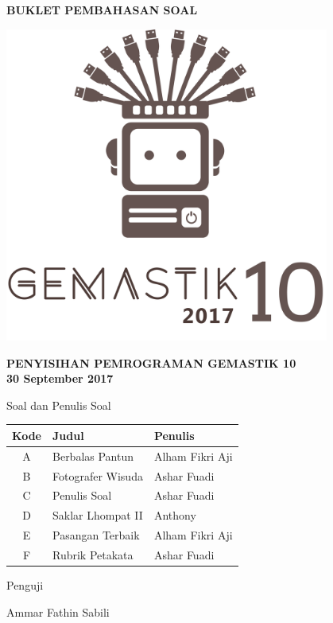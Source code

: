 \documentclass[a4paper]{article}
\begin{document}
\begin{titlepage}
\begin{center}

    \textbf{\huge BUKLET PEMBAHASAN SOAL}
    
    \vspace{1cm} %
    
    \includegraphics[width=0.8\textwidth]{../gemastiklogo}
    
	\vspace{1cm} %
    
    \textbf{\LARGE PENYISIHAN PEMROGRAMAN GEMASTIK 10}\\[0.5cm]
    \textbf{\LARGE 30 September 2017}

	\vfill
	
	{\Large Soal dan Penulis Soal}
	
	\vspace{.1cm}
	
	\def\arraystretch{1.5} %
	\begin{tabular}{|c|l|l|}
		\hline
		\textbf{Kode} & \textbf{Judul} & \textbf{Penulis} \\
		\hline
		A & Berbalas Pantun & Alham Fikri Aji \\
		B & Fotografer Wisuda & Ashar Fuadi \\
		C & Penulis Soal & Ashar Fuadi \\
		D & Saklar Lhompat II & Anthony \\
		E & Pasangan Terbaik & Alham Fikri Aji \\
		F & Rubrik Petakata & Ashar Fuadi \\
		\hline
	\end{tabular}
	
	\vspace{.3cm}
	
	{\Large Penguji}
	
	Ammar Fathin Sabili

\end{center}
\end{titlepage}
\end{document}
